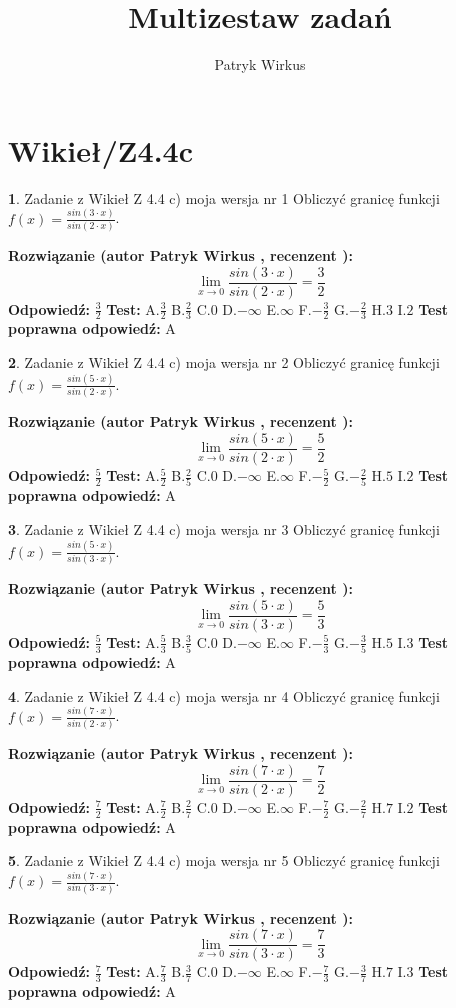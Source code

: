 \documentclass[12pt, a4paper]{article}
\title{Multizestaw zadań}
\author{Patryk Wirkus}
\date{}
\theoremstyle{definition} %
\newtheorem{zad}{}
\newcommand{\kategoria}[1]{\section{#1}}
\newcommand{\zadStart}[1]{\begin{zad}#1\newline}
\newcommand{\zadStop}{\end{zad}}
\newcommand{\rozwStart}[2]{\noindent \textbf{Rozwiązanie (autor #1 , recenzent #2): }\newline}
\newcommand{\rozwStop}{\newline}
\newcommand{\odpStart}{\noindent \textbf{Odpowiedź:}\newline}
\newcommand{\odpStop}{\newline}
\newcommand{\testStart}{\noindent \textbf{Test:}\newline}
\newcommand{\testStop}{\newline}
\newcommand{\kluczStart}{\noindent \textbf{Test poprawna odpowiedź:}\newline}
\newcommand{\kluczStop}{\newline}
\begin{document}
\maketitle

\kategoria{Wikieł/Z4.4c}


\zadStart{Zadanie z Wikieł Z 4.4 c) moja wersja nr 1}
Obliczyć granicę funkcji $f(x)=\frac{sin(3\cdot x)}{sin(2\cdot x)}$.
\zadStop
\rozwStart{Patryk Wirkus}{}
$$\lim\limits_{x\to 0}\frac{sin(3\cdot x)}{sin(2\cdot x)}=
\frac{3}{2}$$
\rozwStop
\odpStart
$\frac{3}{2}$
\odpStop
\testStart
A.$\frac{3}{2}$
B.$\frac{2}{3}$
C.$0$
D.$-\infty$
E.$\infty$
F.$-\frac{3}{2}$
G.$-\frac{2}{3}$
H.$3$
I.$2$
\testStop
\kluczStart
A
\kluczStop



\zadStart{Zadanie z Wikieł Z 4.4 c) moja wersja nr 2}
Obliczyć granicę funkcji $f(x)=\frac{sin(5\cdot x)}{sin(2\cdot x)}$.
\zadStop
\rozwStart{Patryk Wirkus}{}
$$\lim\limits_{x\to 0}\frac{sin(5\cdot x)}{sin(2\cdot x)}=
\frac{5}{2}$$
\rozwStop
\odpStart
$\frac{5}{2}$
\odpStop
\testStart
A.$\frac{5}{2}$
B.$\frac{2}{5}$
C.$0$
D.$-\infty$
E.$\infty$
F.$-\frac{5}{2}$
G.$-\frac{2}{5}$
H.$5$
I.$2$
\testStop
\kluczStart
A
\kluczStop



\zadStart{Zadanie z Wikieł Z 4.4 c) moja wersja nr 3}
Obliczyć granicę funkcji $f(x)=\frac{sin(5\cdot x)}{sin(3\cdot x)}$.
\zadStop
\rozwStart{Patryk Wirkus}{}
$$\lim\limits_{x\to 0}\frac{sin(5\cdot x)}{sin(3\cdot x)}=
\frac{5}{3}$$
\rozwStop
\odpStart
$\frac{5}{3}$
\odpStop
\testStart
A.$\frac{5}{3}$
B.$\frac{3}{5}$
C.$0$
D.$-\infty$
E.$\infty$
F.$-\frac{5}{3}$
G.$-\frac{3}{5}$
H.$5$
I.$3$
\testStop
\kluczStart
A
\kluczStop



\zadStart{Zadanie z Wikieł Z 4.4 c) moja wersja nr 4}
Obliczyć granicę funkcji $f(x)=\frac{sin(7\cdot x)}{sin(2\cdot x)}$.
\zadStop
\rozwStart{Patryk Wirkus}{}
$$\lim\limits_{x\to 0}\frac{sin(7\cdot x)}{sin(2\cdot x)}=
\frac{7}{2}$$
\rozwStop
\odpStart
$\frac{7}{2}$
\odpStop
\testStart
A.$\frac{7}{2}$
B.$\frac{2}{7}$
C.$0$
D.$-\infty$
E.$\infty$
F.$-\frac{7}{2}$
G.$-\frac{2}{7}$
H.$7$
I.$2$
\testStop
\kluczStart
A
\kluczStop



\zadStart{Zadanie z Wikieł Z 4.4 c) moja wersja nr 5}
Obliczyć granicę funkcji $f(x)=\frac{sin(7\cdot x)}{sin(3\cdot x)}$.
\zadStop
\rozwStart{Patryk Wirkus}{}
$$\lim\limits_{x\to 0}\frac{sin(7\cdot x)}{sin(3\cdot x)}=
\frac{7}{3}$$
\rozwStop
\odpStart
$\frac{7}{3}$
\odpStop
\testStart
A.$\frac{7}{3}$
B.$\frac{3}{7}$
C.$0$
D.$-\infty$
E.$\infty$
F.$-\frac{7}{3}$
G.$-\frac{3}{7}$
H.$7$
I.$3$
\testStop
\kluczStart
A
\kluczStop
\end{document}
